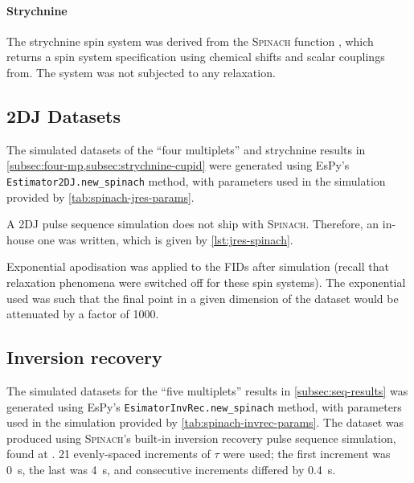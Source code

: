 \paragraph{Strychnine}
The strychnine spin system was derived from
the \textsc{Spinach} function , which returns a
spin system specification using chemical shifts and scalar couplings
from\cite[Appendix 5]{Berger2004}. The system was not subjected to any relaxation.



\subsection{\acs{2DJ} Datasets}
The simulated datasets of the ``four multiplets'' and strychnine results in
\cref{subsec:four-mp,subsec:strychnine-cupid} were generated
using \ac{EsPy}'s \texttt{Estimator2DJ.new_spinach} method, with
parameters used in the simulation provided by
\cref{tab:spinach-jres-params}.



A \ac{2DJ} pulse sequence simulation does not ship with \textsc{Spinach}.
Therefore, an in-house one was written, which is given by
\cref{lst:jres-spinach}.


Exponential apodisation was applied to the \acp{FID} after simulation
(recall that relaxation phenomena were switched off for these spin systems).
The exponential used was such that the final point in a given dimension of the
dataset would be attenuated by a factor of 1000.

\subsection{Inversion recovery}
\label{subsec:invrec-datasets}
The simulated datasets for the ``five multiplets'' results in
\cref{subsec:seq-results} was generated using \ac{EsPy}'s
\texttt{EsimatorInvRec.new_spinach} method, with
parameters used in the simulation provided by
\cref{tab:spinach-invrec-params}.
 The dataset was produced using \textsc{Spinach}'s built-in
inversion recovery pulse sequence simulation, found at
. 21 evenly-spaced increments of
$\tau$ were used; the first increment was \qty{0}{\second}, the last was
\qty{4}{\second}, and consecutive increments differed by \qty{0.4}{\second}.

